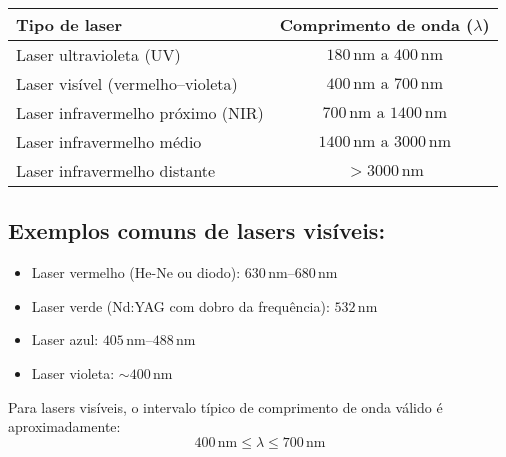 \begin{center}
\begin{tabular}{|l|c|}
\hline
\textbf{Tipo de laser} & \textbf{Comprimento de onda (\( \lambda \))} \\
\hline
Laser ultravioleta (UV) & \(180\,\mathrm{nm} \text{ a } 400\,\mathrm{nm}\) \\
\hline
Laser visível (vermelho–violeta) & \(400\,\mathrm{nm} \text{ a } 700\,\mathrm{nm}\) \\
\hline
Laser infravermelho próximo (NIR) & \(700\,\mathrm{nm} \text{ a } 1400\,\mathrm{nm}\) \\
\hline
Laser infravermelho médio & \(1400\,\mathrm{nm} \text{ a } 3000\,\mathrm{nm}\) \\
\hline
Laser infravermelho distante & \(>3000\,\mathrm{nm}\) \\
\hline
\end{tabular}
\end{center}

\vspace{0.5cm}

\subsection*{Exemplos comuns de lasers visíveis:}
\begin{itemize}
    \item Laser vermelho (He-Ne ou diodo): \(630\,\mathrm{nm} – 680\,\mathrm{nm}\)
    \item Laser verde (Nd:YAG com dobro da frequência): \(532\,\mathrm{nm}\)
    \item Laser azul: \(405\,\mathrm{nm} – 488\,\mathrm{nm}\)
    \item Laser violeta: \( \sim 400\,\mathrm{nm} \)
\end{itemize}

\vspace{0.5cm}

Para lasers visíveis, o intervalo típico de comprimento de onda válido é aproximadamente:
\[
\boxed{400\,\mathrm{nm} \leq \lambda \leq 700\,\mathrm{nm}}
\]

